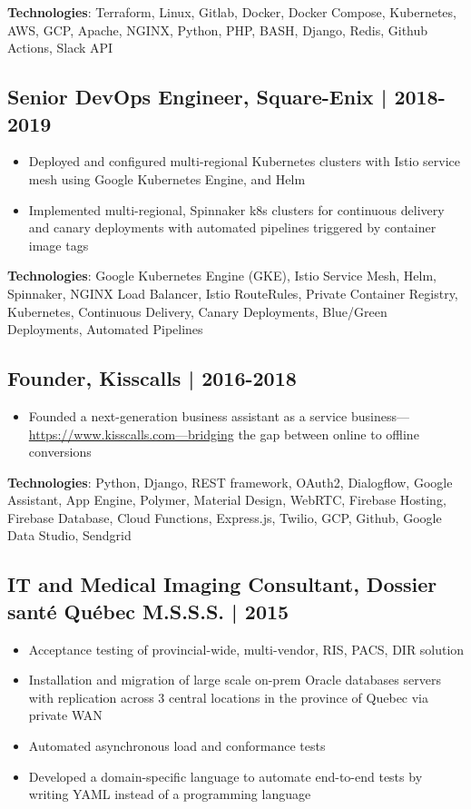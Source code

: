 \documentclass[11pt,a4paper]{article}
\begin{document}
\textbf{Technologies}: Terraform, Linux, Gitlab, Docker, Docker Compose, Kubernetes, AWS, GCP, Apache, NGINX, Python, PHP, BASH, Django, Redis, Github Actions, Slack API
\subsection*{Senior DevOps Engineer, Square-Enix | 2018-2019}
\label{sec:orgce6bbac}
\begin{itemize}
\item Deployed and configured multi-regional Kubernetes clusters with Istio service mesh using Google Kubernetes Engine, and Helm
\item Implemented multi-regional, Spinnaker k8s clusters for continuous delivery and canary deployments with automated pipelines triggered by container image tags
\end{itemize}

\textbf{Technologies}: Google Kubernetes Engine (GKE), Istio Service Mesh, Helm, Spinnaker, NGINX Load Balancer, Istio RouteRules, Private Container Registry, Kubernetes, Continuous Delivery, Canary Deployments, Blue/Green Deployments, Automated Pipelines
\subsection*{Founder, Kisscalls | 2016-2018}
\label{sec:org6a45116}
\begin{itemize}
\item Founded a next-generation business assistant as a service business—\url{https://www.kisscalls.com—bridging} the gap between online to offline conversions
\end{itemize}

\textbf{Technologies}: Python, Django, REST framework, OAuth2, Dialogflow, Google Assistant, App Engine, Polymer, Material Design, WebRTC, Firebase Hosting, Firebase Database, Cloud Functions, Express.js, Twilio, GCP, Github, Google Data Studio, Sendgrid
\subsection*{IT and Medical Imaging Consultant, Dossier santé Québec M.S.S.S. | 2015}
\label{sec:org315bcfe}
\begin{itemize}
\item Acceptance testing of provincial-wide, multi-vendor, RIS, PACS, DIR solution
\item Installation and migration of large scale on-prem Oracle databases servers with replication across 3 central locations in the province of Quebec via private WAN
\item Automated asynchronous load and conformance tests
\item Developed a domain-specific language to automate end-to-end tests by writing YAML instead of a programming language
\end{itemize}
\end{document}

